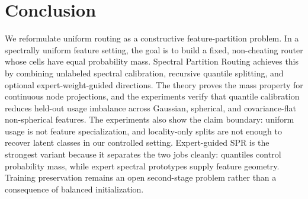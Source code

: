 \documentclass{article}
\begin{document}
\section{Conclusion}

We reformulate uniform routing as a constructive feature-partition problem.  In a
spectrally uniform feature setting, the goal is to build a fixed, non-cheating
router whose cells have equal probability mass.  Spectral Partition Routing
achieves this by combining unlabeled spectral calibration, recursive quantile
splitting, and optional expert-weight-guided directions.  The theory proves the
mass property for continuous node projections, and the experiments verify that
quantile calibration reduces held-out usage imbalance across Gaussian,
spherical, and covariance-flat non-spherical features.  The experiments also
show the claim boundary: uniform usage is not feature specialization, and
locality-only splits are not enough to recover latent classes in our controlled
setting.  Expert-guided SPR is the strongest variant because it separates the
two jobs cleanly: quantiles control probability mass, while expert spectral
prototypes supply feature geometry.  Training preservation remains an open
second-stage problem rather than a consequence of balanced initialization.



\end{document}
